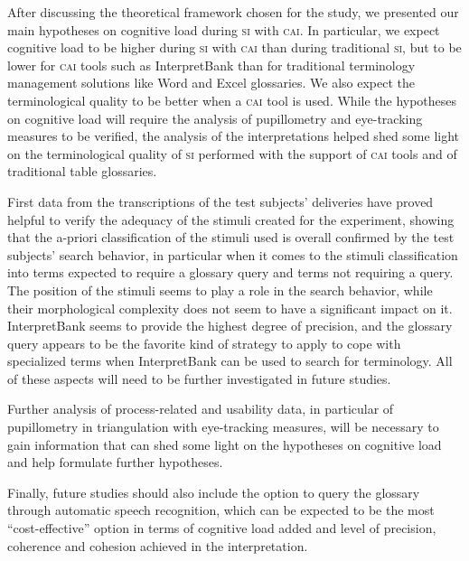 \documentclass[output=paper]{langsci/langscibook}
\begin{document}
After discussing the theoretical framework chosen for the study, we presented our main hypotheses on cognitive load during \textsc{si} with \textsc{cai}. In particular, we expect cognitive load to be higher during \textsc{si} with \textsc{cai} than during traditional \textsc{si}, but to be lower for \textsc{cai} tools such as InterpretBank than for traditional terminology management solutions like Word and Excel glossaries. We also expect the terminological quality to be better when a \textsc{cai} tool is used. While the hypotheses on cognitive load will require the analysis of pupillometry and eye-tracking measures to be verified, the analysis of the interpretations helped shed some light on the terminological quality of \textsc{si} performed with the support of \textsc{cai} tools and of traditional table glossaries. 

First data from the transcriptions of the test subjects’ deliveries have proved helpful to verify the adequacy of the stimuli created for the experiment, showing that the a-priori classification of the stimuli used is overall confirmed by the test subjects’ search behavior, in particular when it comes to the stimuli classification into terms expected to require a glossary query and terms not requiring a query. The position of the stimuli seems to play a role in the search behavior, while their morphological complexity does not seem to have a significant impact on it. InterpretBank seems to provide the highest degree of precision, and the glossary query appears to be the favorite kind of strategy to apply to cope with specialized terms when InterpretBank can be used to search for terminology. All of these aspects will need to be further investigated in future studies.

Further analysis of process-related and usability data, in particular of pupillometry in triangulation with eye-tracking measures, will be necessary to gain information that can shed some light on the hypotheses on cognitive load and help formulate further hypotheses.

Finally, future studies should also include the option to query the glossary through automatic speech recognition, which can be expected to be the most ``cost-effective'' option in terms of cognitive load added and level of precision, coherence and cohesion achieved in the interpretation. 
\sloppy
\printbibliography[heading=subbibliography,notkeyword=this] 
\end{document}
